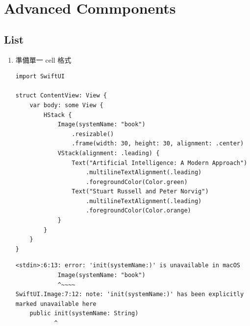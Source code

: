 \documentclass[a4paper,12pt]{article}
\begin{document}
\section{Advanced Commponents}
\label{sec:org7f59c97}
\subsection{List}
\label{sec:org920e114}
\begin{enumerate}
\item 準備單一 cell 格式
\label{sec:org4a801c4}
\lstset{breaklines=true,language=swift,label= ,caption= ,captionpos=b,firstnumber=1,numbers=left}
\begin{lstlisting}
import SwiftUI

struct ContentView: View {
    var body: some View {
        HStack {
            Image(systemName: "book")
                .resizable()
                .frame(width: 30, height: 30, alignment: .center)
            VStack(alignment: .leading) {
                Text("Artificial Intelligence: A Modern Approach")
                    .multilineTextAlignment(.leading)
                    .foregroundColor(Color.green)
                Text("Stuart Russell and Peter Norvig")
                    .multilineTextAlignment(.leading)
                    .foregroundColor(Color.orange)
            }
        }
    }
}

\end{lstlisting}

\begin{verbatim}
<stdin>:6:13: error: 'init(systemName:)' is unavailable in macOS
            Image(systemName: "book")
            ^~~~~
SwiftUI.Image:7:12: note: 'init(systemName:)' has been explicitly marked unavailable here
    public init(systemName: String)
           ^
\end{verbatim}



\end{enumerate}
\end{document}
